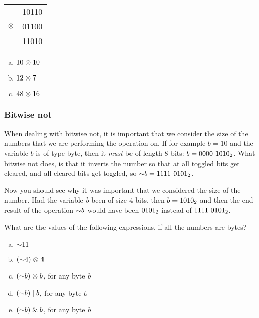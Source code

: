 \begin{center}
  \begin{tabular}{lr}
    & 10110  \\
    $\mathrel{\otimes}$ & 01100 \\
    \hline
    & 11010 \\
  \end{tabular}
\end{center}

\begin{Exercise}[label={bitxor}]
  \begin{enumerate}[(a)]
  \item $10 \mathrel{\otimes} 10$
  \item $12 \mathrel{\otimes} 7$
  \item $48 \mathrel{\otimes} 16$
  \end{enumerate}
\end{Exercise}

\subsubsection{Bitwise not}

When dealing with bitwise not, it is important that we consider the
size of the numbers that we are performing the operation on. If for
example $b=10$ and the variable $b$ is of type byte, then it
\textit{must} be of length 8 bits: $b=\mbox{\ensuremath{0000\ 1010_2}}$. What bitwise not
does, is that it inverts the number so that at all toggled bits get
cleared, and all cleared bits get toggled, so $\mathord{\sim} b = \mbox{\ensuremath{1111\
0101_2}}$.

Now you should see why it was important that we considered the size of
the number. Had the variable $b$ been of size 4 bits, then $b = \mbox{\ensuremath{1010_2}}$
and then the end result of the operation $\mathord{\sim} b$ would have been
$\mbox{\ensuremath{0101_2}}$ instead of $\mbox{\ensuremath{1111\ 0101_2}}$.

\begin{Exercise}[label={bitnot}]
  What are the values of the following expressions, if all the numbers
  are bytes?

  \begin{enumerate}[(a)]
  \item $\mathord{\sim} 11$
  \item $(\mathord{\sim} 4) \mathrel{\otimes} 4$
  \item $(\mathord{\sim} b) \mathrel{\otimes} b$, for any byte $b$
  \item $(\mathord{\sim} b) \mathrel{|} b$, for any byte $b$
  \item $(\mathord{\sim} b) \mathrel{\&} b$, for any byte $b$
  \end{enumerate}

\end{Exercise}

